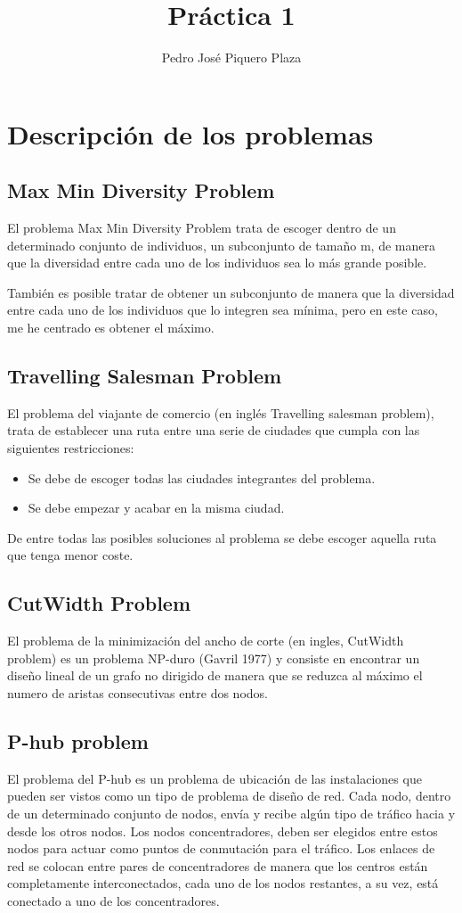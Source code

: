 \documentclass[12pt,a4paper,draft,openany]{article}
\author{Pedro José Piquero Plaza}
\title{Práctica 1}
\begin{document}
 \section{Descripción de los problemas}
 \subsection{Max Min Diversity Problem}
 El problema Max Min Diversity Problem trata de escoger dentro de un determinado conjunto de individuos, un subconjunto de tamaño m, de manera que la diversidad entre cada uno de
 los individuos sea lo más grande posible.
 
 También es posible tratar de obtener un subconjunto de manera que la diversidad entre cada uno de los individuos que lo integren sea mínima, pero en este caso, me he centrado es obtener el máximo.
 \subsection{Travelling Salesman Problem}
 El problema del viajante de comercio (en inglés Travelling salesman problem), trata de establecer una ruta entre una serie de ciudades que cumpla con las siguientes restricciones:
 
 \begin{itemize}
 \item Se debe de escoger todas las ciudades integrantes del problema.
 \item Se debe empezar y acabar en la misma ciudad.
 \end{itemize}
 
De entre todas las posibles soluciones al problema se debe escoger aquella ruta que tenga menor coste.
 
 \subsection{CutWidth Problem}
El problema de la minimización del ancho de corte (en ingles, CutWidth problem) es un problema NP-duro (Gavril 1977) y consiste en encontrar un diseño lineal de un grafo no dirigido de manera que se reduzca al máximo el numero de aristas consecutivas entre dos nodos.

\subsection{P-hub problem}
El problema del P-hub es un problema de ubicación de las instalaciones que pueden ser vistos como un tipo de problema de diseño de red. Cada nodo, dentro de un determinado conjunto de nodos, envía y recibe algún tipo de tráfico hacia y desde los otros nodos. Los nodos concentradores, deben ser elegidos entre estos nodos para actuar como puntos de conmutación para el tráfico. Los enlaces de red se colocan entre pares de concentradores de manera que los centros están completamente interconectados, cada uno de los nodos restantes, a su vez, está conectado a uno de los concentradores. 
\end{document}
